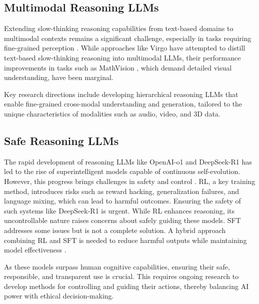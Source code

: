 \subsection{Multimodal Reasoning LLMs}\label{mm-srs}

Extending slow-thinking reasoning capabilities from text-based domains to multimodal contexts remains a significant challenge, especially in tasks requiring fine-grained perception \cite{SlowPerception, vll_app, li2023lans}. While approaches like Virgo \cite{virgo} have attempted to distill text-based slow-thinking reasoning into multimodal LLMs, their performance improvements in tasks such as MathVision \cite{MathVision}, which demand detailed visual understanding, have been marginal.

Key research directions include developing hierarchical reasoning LLMs that enable fine-grained cross-modal understanding and generation, tailored to the unique characteristics of modalities such as audio, video, and 3D data.



\subsection{Safe Reasoning LLMs}\label{srs_safety}

The rapid development of reasoning LLMs like OpenAI-o1 \cite{openai_o1} and DeepSeek-R1 \cite{Deepseek-R1} has led to the rise of superintelligent models capable of continuous self-evolution. 
However, this progress brings challenges in safety and control \cite{mei2024slang, mei2024hiddenguard, mei2024not}. 
RL, a key training method, introduces risks such as reward hacking, generalization failures, and language mixing, which can lead to harmful outcomes. 
Ensuring the safety of such systems like DeepSeek-R1 is urgent. While RL enhances reasoning, its uncontrollable nature raises concerns about safely guiding these models. 
SFT addresses some issues but is not a complete solution. 
A hybrid approach combining RL and SFT is needed to reduce harmful outputs while maintaining model effectiveness \cite{parmar2025challenges}.

As these models surpass human cognitive capabilities, ensuring their safe, responsible, and transparent use is crucial. 
This requires ongoing research to develop methods for controlling and guiding their actions, thereby balancing AI power with ethical decision-making. 





